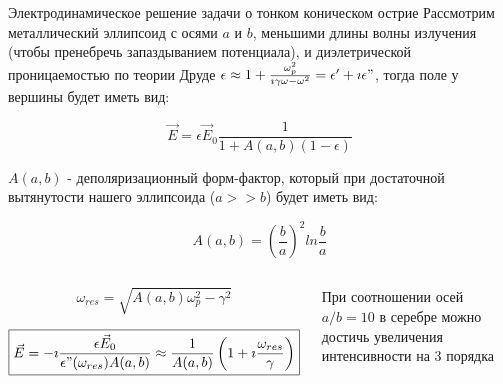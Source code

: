 \documentclass[9pt, compress, xcolor=table]{beamer}
\begin{document}
\begin{frame}{Электродинамическое решение задачи о тонком коническом острие}
Рассмотрим металлический эллипсоид с осями $a$ и $b$, меньшими длины волны излучения (чтобы пренебречь запаздыванием потенциала), и диэлетрической проницаемостью по теории Друде $\epsilon \approx 1+\frac{\omega_p^2}{\imath\gamma\omega -\omega^2}=\epsilon'+\imath \epsilon"$, тогда поле у вершины будет иметь вид:

\begin{equation*}
\vec E = \epsilon \vec E_0\frac{1}{1+A(a,b)(1-\epsilon)}
\end{equation*}

$A(a,b)$ - деполяризационный форм-фактор, который при достаточной вытянутости нашего эллипсоида ($a>>b$) будет иметь вид:

\begin{equation*}
A(a,b) = \left(\frac{b}{a}\right)^2 ln \frac{b}{a}
\end{equation*}

\begin{columns}
\column{8cm}
\begin{centering}
\begin{equation*}\boxed{
\omega_{res}=\sqrt{A(a,b)\omega_p^2-\gamma^2}}
\end{equation*}

\begin{equation*}
\boxed{\vec E = -\imath \frac{\epsilon \vec E_0}{\epsilon"(\omega_{res}) A(a,b)} \approx\frac{1}{A(a,b)}\left(1+\imath\frac{\omega_{res}}{\gamma}\right)}
\end{equation*}
\end{centering}
\column{4cm}
При соотношении осей $a/b=10$ в серебре можно достичь увеличения интенсивности на 3 порядка
\end{columns}
\end{frame}
\end{document}
